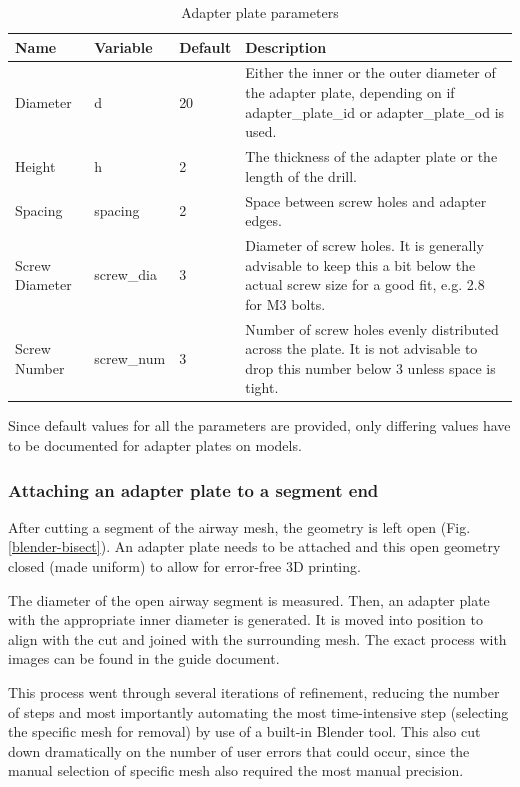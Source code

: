 \documentclass[MME,Projekt,english]{twbook}%
\begin{document}
\begin{table}[h]
	\caption{Adapter plate parameters}\label{mse}
    \centering
	\begin{tabular}{|p{}|p{}|p{}|p{}|}
    \hline
        Name & Variable & Default & Description \\ \hline
        Diameter & d & 20 & Either the inner or the outer diameter of the adapter plate, depending on if adapter\_plate\_id or adapter\_plate\_od is used. \\ \hline
        Height & h & 2 & The thickness of the adapter plate or the length of the drill. \\ \hline
        Spacing & spacing & 2 & Space between screw holes and adapter edges. \\ \hline
        Screw Diameter & screw\_dia & 3 & Diameter of screw holes. It is generally advisable to keep this a bit below the actual screw size for a good fit, e.g. 2.8 for M3 bolts. \\ \hline
        Screw Number & screw\_num & 3 & Number of screw holes evenly distributed across the plate. It is not advisable to drop this number below 3 unless space is tight. \\ \hline
    \end{tabular}
\end{table}

Since default values for all the parameters are provided, only differing values have to be documented for adapter plates on models.

\subsubsection{Attaching an adapter plate to a segment end}

After cutting a segment of the airway mesh, the geometry is left open (Fig. \ref{blender-bisect}). An adapter plate needs to be attached
and this open geometry closed (made uniform) to allow for error-free 3D printing.

The diameter of the open airway segment is measured. Then, an adapter plate with the appropriate inner diameter is generated. It is moved
into position to align with the cut and joined with the surrounding mesh. The exact process with images can be found in the guide document.

This process went through several iterations of refinement, reducing the number of steps and most importantly automating
the most time-intensive step (selecting the specific mesh for removal) by use of a built-in Blender tool. This also cut down
dramatically on the number of user errors that could occur, since the manual selection of specific mesh also required the most manual
precision.
\end{document}
